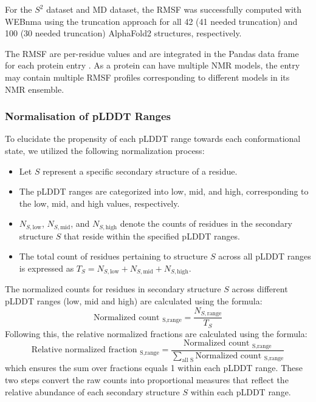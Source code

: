 For the $S^2$ dataset and MD dataset, the RMSF was successfully computed with WEBnma using the truncation approach for all 42 (41 needed truncation) and 100 (30 needed truncation) AlphaFold2 structures, respectively.

The RMSF are per-residue values and are integrated in the Pandas data frame for each protein entry \cite{mckinney-proc-scipy-2010, reback2020pandas}. As a protein can have multiple NMR models, the entry may contain multiple RMSF profiles corresponding to different models in its NMR ensemble.


\subsubsection{Normalisation of pLDDT Ranges
\label{sec:norm}}

To elucidate the propensity of each pLDDT range towards each conformational state, we utilized the following normalization process:
\begin{itemize}
    \item Let \( S \) represent a specific secondary structure of a residue.
    \item The pLDDT ranges are categorized into low, mid, and high, corresponding to the low, mid, and high values, respectively.
    \item \( N_{S, \text{low}} \), \( N_{S, \text{mid}} \), and \( N_{S, \text{high}} \) denote the counts of residues in the secondary structure \( S \) that reside within the specified pLDDT ranges.
    \item The total count of residues pertaining to structure \( S \) across all pLDDT ranges is expressed as \( T_S = N_{S,\text{low}} + N_{S,\text{mid}} + N_{S,\text{high}} \).
\end{itemize}
The normalized counts for residues in secondary structure \( S \) across different pLDDT ranges (low, mid and high) are calculated using the formula:
\begin{equation}
\text{Normalized count }_{\text{S,range}} = \frac{N_{S,\text{range}}}{T_S}
\end{equation}
Following this, the relative normalized fractions are calculated using the formula:
\begin{equation}
    \text{Relative normalized fraction }_{\text{S,range}} = \frac{\text{Normalized count }_{\text{S,range}}}{\sum_{\text{all S}} \text{Normalized count }_{\text{S,range}}}
\end{equation}
which ensures the sum over fractions equals 1 within each pLDDT range.
These two steps convert the raw counts into proportional measures that reflect the relative abundance of each secondary structure \( S \) within each pLDDT range.

